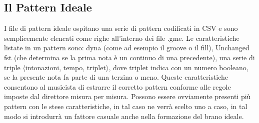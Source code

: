 \subsection{Il Pattern Ideale}
I file di pattern ideale ospitano una serie di pattern codificati in CSV e sono semplicemente elencati come righe all'interno dei file .gme.
Le caratteristiche listate in un pattern sono: dyna (come ad esempio il groove o il fill), Unchanged fst (che determina se la prima nota è un continuo di una precedente), una serie di triple $\langle$intonazioni, tempo, triplet$\rangle$, dove triplet indica con un numero booleano, se la presente nota fa parte di una terzina o meno.
Queste caratteristiche consentono al musicista di estrarre il corretto pattern conforme alle regole imposte dal direttore misura per misura.
Possono essere ovviamente presenti più pattern con le stese caratteristiche, in tal caso ne verrà scelto uno a caso, in tal modo si introdurrà un fattore casuale anche nella formazione del brano ideale.
